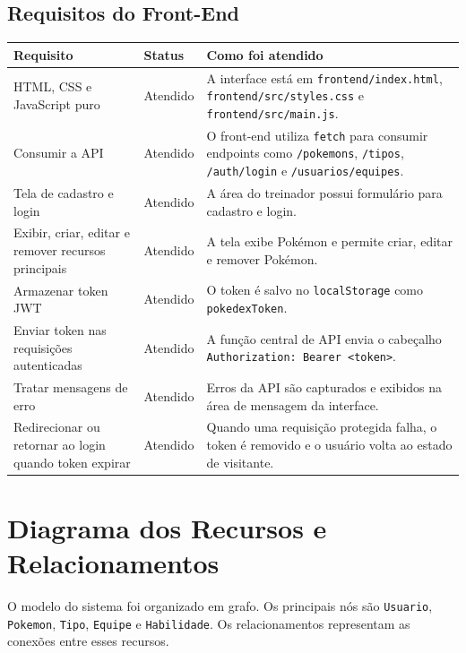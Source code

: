\documentclass[12pt,a4paper]{article}
\begin{document}
\subsection{Requisitos do Front-End}

\begin{longtable}{p{4.4cm}p{2.2cm}p{7.2cm}}
\toprule
\textbf{Requisito} & \textbf{Status} & \textbf{Como foi atendido}\\
\midrule
\endhead
HTML, CSS e JavaScript puro & Atendido & A interface está em \texttt{frontend/index.html}, \texttt{frontend/src/styles.css} e \texttt{frontend/src/main.js}.\\
Consumir a API & Atendido & O front-end utiliza \texttt{fetch} para consumir endpoints como \texttt{/pokemons}, \texttt{/tipos}, \texttt{/auth/login} e \texttt{/usuarios/equipes}.\\
Tela de cadastro e login & Atendido & A área do treinador possui formulário para cadastro e login.\\
Exibir, criar, editar e remover recursos principais & Atendido & A tela exibe Pokémon e permite criar, editar e remover Pokémon.\\
Armazenar token JWT & Atendido & O token é salvo no \texttt{localStorage} como \texttt{pokedexToken}.\\
Enviar token nas requisições autenticadas & Atendido & A função central de API envia o cabeçalho \texttt{Authorization: Bearer <token>}.\\
Tratar mensagens de erro & Atendido & Erros da API são capturados e exibidos na área de mensagem da interface.\\
Redirecionar ou retornar ao login quando token expirar & Atendido & Quando uma requisição protegida falha, o token é removido e o usuário volta ao estado de visitante.\\
\bottomrule
\end{longtable}

\section{Diagrama dos Recursos e Relacionamentos}

O modelo do sistema foi organizado em grafo. Os principais nós são \texttt{Usuario}, \texttt{Pokemon}, \texttt{Tipo}, \texttt{Equipe} e \texttt{Habilidade}. Os relacionamentos representam as conexões entre esses recursos.
\end{document}
